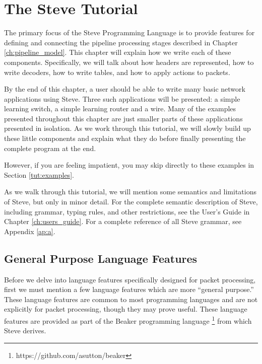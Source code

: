 \chapter{The Steve Tutorial} \label{ch:tutorial}


%

The primary focus of the Steve Programming Language is to provide features for
defining and connecting the pipeline processing stages described in Chapter
\ref{ch:pipeline_model}. This chapter will explain how we write each of these
components. Specifically, we will talk about how headers are represented, how to
write decoders, how to write tables, and how to apply actions to packets.

By the end of this chapter, a user should be able to write many basic network
applications using Steve. Three such applications will be presented: a simple
learning switch, a simple learning router and a wire. Many of the examples
presented throughout this chapter are just smaller parts of these applications
presented in isolation. As we work through this tutorial, we will slowly build
up these little components and explain what they do before finally presenting
the complete program at the end.

However, if you are feeling impatient, you may skip directly to these examples
in Section \ref{tut:examples}.

As we walk through this tutorial, we will mention some semantics and limitations
of Steve, but only in minor detail. For the complete semantic description of
Steve, including grammar, typing rules, and other restrictions, see the User's
Guide in Chapter \ref{ch:users_guide}. For a complete reference of all Steve
grammar, see Appendix \ref{ap:a}.

\section{General Purpose Language Features} \label{tut:gen_purp}

Before we delve into language features specifically designed for packet
processing, first we must mention a few language features which are more
``general purpose.'' These language features are common to most programming
languages and are not explicitly for packet processing, though they may prove
useful. These language features are provided as part of the Beaker programming
language \footnote{https://github.com/asutton/beaker} from which Steve derives.


